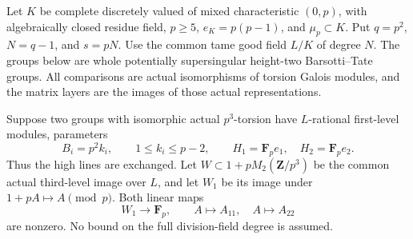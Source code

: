 Let \(K\) be complete discretely valued of mixed characteristic
\((0,p)\), with algebraically closed residue field,
\(p\ge5\), \(e_K=p(p-1)\), and \(\mu_p\subset K\).
Put \(q=p^2\), \(N=q-1\), and \(s=pN\).
Use the common tame good field \(L/K\) of degree \(N\).
The groups below are whole potentially supersingular
height-two Barsotti--Tate groups. All comparisons are actual
isomorphisms of torsion Galois modules, and the matrix layers
are the images of those actual representations.

\begin{lemma}
\label{lem:B-RD85-diagonal}
Suppose two groups with isomorphic actual \(p^3\)-torsion
have \(L\)-rational first-level modules, parameters
\[
 B_i=p^2k_i,\qquad 1\le k_i\le p-2,
       \qquad H_1=\mathbf F_pe_1,\quad H_2=\mathbf F_pe_2.
                                                        \tag{B-RD85.1}
\]
Thus the high lines are exchanged. Let
\(W\subset1+pM_2(\mathbf Z/p^3)\) be the common actual
third-level image over \(L\), and let \(W_1\) be its
image under \(1+pA\longmapsto A\pmod p\).
Both linear maps
\[
        W_1\longrightarrow\mathbf F_p,
        \qquad A\longmapsto A_{11},\quad A\longmapsto A_{22}
                                                        \tag{B-RD85.2}
\]
are nonzero. No bound on the full division-field degree
is assumed.
\end{lemma}
